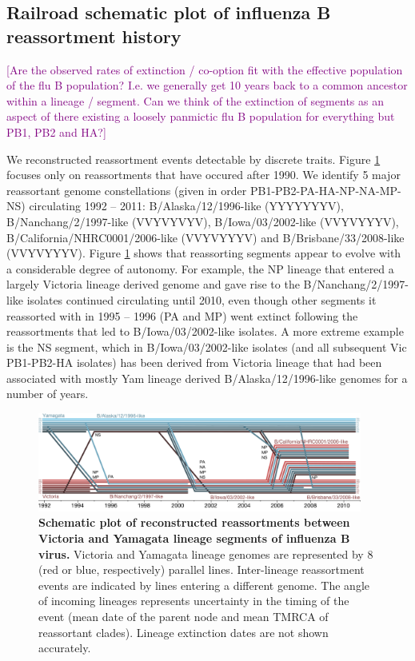 \documentclass[11pt,oneside,letterpaper]{article}
\def\tbc#1{\textcolor{purple}{[#1]}}
\begin{document}
\subsection*{Railroad schematic plot of influenza B reassortment history}

\tbc{Are the observed rates of extinction / co-option fit with the effective population of the flu B population?  I.e. we generally get 10 years back to a common ancestor within a lineage / segment.  Can we think of the extinction of segments as an aspect of there existing a loosely panmictic flu B population for everything but PB1, PB2 and HA?}

We reconstructed reassortment events detectable by discrete traits.
Figure \ref{railroadPlot} focuses only on reassortments that have occured after 1990.
We identify 5 major reassortant genome constellations (given in order PB1-PB2-PA-HA-NP-NA-MP-NS) circulating 1992 -- 2011: B/Alaska/12/1996-like (YYYYYYYV), B/Nanchang/2/1997-like (VVYVYVYV), B/Iowa/03/2002-like (VVYVYYYV), B/California/NHRC0001/2006-like (VVYVYYYV) and B/Brisbane/33/2008-like (VVYVYYYV).
Figure \ref{railroadPlot} shows that reassorting segments appear to evolve with a considerable degree of autonomy.
For example, the NP lineage that entered a largely Victoria lineage derived genome and gave rise to the B/Nanchang/2/1997-like isolates continued circulating until 2010, even though other segments it reassorted with in 1995 -- 1996 (PA and MP) went extinct following the reassortments that led to B/Iowa/03/2002-like isolates.
A more extreme example is the NS segment, which in B/Iowa/03/2002-like isolates (and all subsequent Vic PB1-PB2-HA isolates) has been derived from Victoria lineage that had been associated with mostly Yam lineage derived B/Alaska/12/1996-like genomes for a number of years.

\begin{figure}
	\centering		
	\includegraphics[width=0.95\textwidth]{figures/RailroadPlotDated.pdf}
	\caption{\textbf{Schematic plot of reconstructed reassortments between Victoria and Yamagata lineage segments of influenza B virus.}
Victoria and Yamagata lineage genomes are represented by 8 (red or blue, respectively) parallel lines.
Inter-lineage reassortment events are indicated by lines entering a different genome.
The angle of incoming lineages represents uncertainty in the timing of the event (mean date of the parent node and mean TMRCA of reassortant clades).
Lineage extinction dates are not shown accurately.}
	\label{railroadPlot}
\end{figure}
\end{document}
